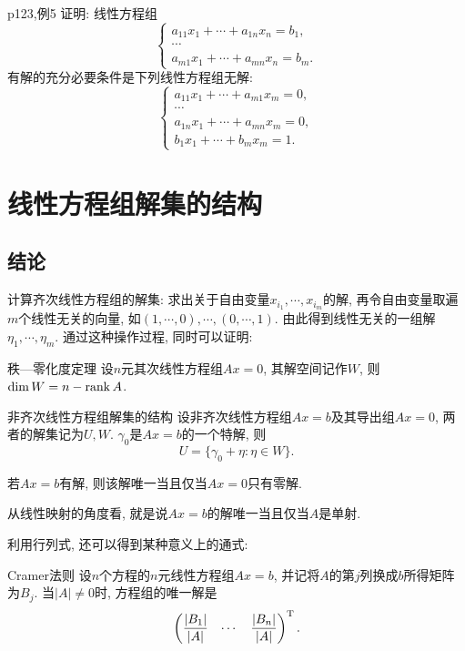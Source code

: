 \begin{example}{p123,例5}
	证明: 线性方程组$$\begin{cases}
		a_{11}x_1+\cdots +a_{1n}x_n=b_1, \\
		\cdots \\
		a_{m1}x_1+\cdots +a_{mn}x_n=b_m.
	\end{cases}$$
	有解的充分必要条件是下列线性方程组无解: $$\begin{cases}
		a_{11}x_1+\cdots +a_{m1}x_m=0, \\
		\cdots \\
		a_{1n}x_1+\cdots +a_{mn}x_m=0, \\
		b_1x_1 + \cdots + b_mx_m=1. 
	\end{cases}$$
\end{example}

\section{线性方程组解集的结构}

\subsection*{结论}

计算齐次线性方程组的解集: 求出关于自由变量$x_{i_1},\cdots ,x_{i_m}$的解, 再令自由变量取遍$m$个线性无关的向量, 如$(1,\cdots ,0),\cdots ,(0,\cdots ,1)$. 由此得到线性无关的一组解$\eta _1,\cdots ,\eta _m$. 通过这种操作过程, 同时可以证明: 

\begin{theorem}{秩—零化度定理}
	设$n$元其次线性方程组$Ax=0$, 其解空间记作$W$, 则$\dim W = n-\operatorname{rank} A$. 
\end{theorem}

\begin{theorem}{非齐次线性方程组解集的结构}
	设非齐次线性方程组$Ax=b$及其导出组$Ax=0$, 两者的解集记为$U,W$. $\gamma _0$是$Ax=b$的一个特解, 则$$U=\{ \gamma _0 + \eta : \eta \in W \}. $$
\end{theorem}

\begin{corollary}{}
	若$Ax=b$有解, 则该解唯一当且仅当$Ax=0$只有零解. 
\end{corollary}
\begin{remark}
	从线性映射的角度看, 就是说$Ax=b$的解唯一当且仅当$A$是单射. 
\end{remark}

利用行列式, 还可以得到某种意义上的通式: 

\begin{theorem}{Cramer法则}
	设$n$个方程的$n$元线性方程组$Ax=b$, 并记将$A$的第$j$列换成$b$所得矩阵为$B_j$. 当$|A| \neq 0$时, 方程组的唯一解是$$\begin{pmatrix}
		\dfrac{|B_1|}{|A|} & \cdots & \dfrac{|B_n|}{|A|}
	\end{pmatrix}^{\operatorname{T}}.$$
\end{theorem}

